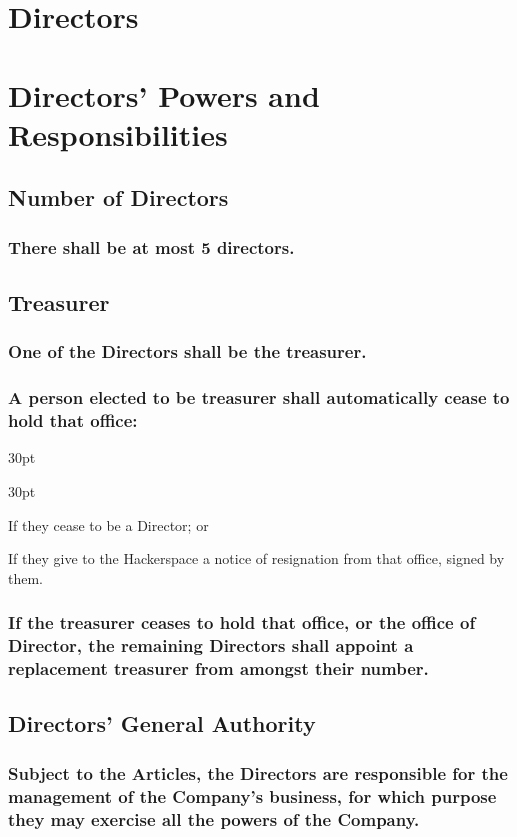 \documentclass[12pt]{article}
\def\clauseindent{30pt}
\newenvironment{subindentlist}{\begin{adjustwidth}{\clauseindent}{}\begin{labeledlist}{\clauseindent}}{\end{labeledlist}\end{adjustwidth}}
\begin{document}
\section*{Directors}
\section*{Directors' Powers and Responsibilities}

\subsection{Number of Directors}
\subsubsection{\label{subsubsection:numdirectors}There shall be at most 5 directors.}

\subsection{Treasurer}
\subsubsection{One of the Directors shall be the treasurer.}
\subsubsection{A person elected to be treasurer shall automatically cease to hold that office:}
\begin{subindentlist}
  \item If they cease to be a Director; or
  \item If they give to the Hackerspace a notice of resignation from that office, signed by them.
\end{subindentlist}
\subsubsection{If the treasurer ceases to hold that office, or the office of Director, the remaining Directors shall appoint a replacement treasurer from amongst their number.}

\subsection{Directors' General Authority}
\subsubsection{Subject to the Articles, the Directors are responsible for the management of the Company’s business, for which purpose they may exercise all the powers of the Company.}
\end{document}
